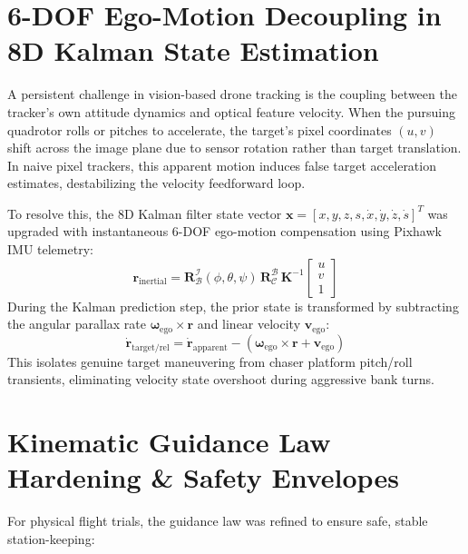 \documentclass[11pt,a4paper]{article}
\begin{document}
\section{6-DOF Ego-Motion Decoupling in 8D Kalman State Estimation}
A persistent challenge in vision-based drone tracking is the coupling between the tracker's own attitude dynamics and optical feature velocity. When the pursuing quadrotor rolls or pitches to accelerate, the target's pixel coordinates $(u, v)$ shift across the image plane due to sensor rotation rather than target translation. In naive pixel trackers, this apparent motion induces false target acceleration estimates, destabilizing the velocity feedforward loop.

To resolve this, the 8D Kalman filter state vector $\mathbf{x} = [x, y, z, s, \dot{x}, \dot{y}, \dot{z}, \dot{s}]^T$ was upgraded with instantaneous 6-DOF ego-motion compensation using Pixhawk IMU telemetry:
\begin{equation}
    \mathbf{r}_{\text{inertial}} = \mathbf{R}_{\mathcal{B}}^{\mathcal{I}}(\phi, \theta, \psi) \, \mathbf{R}_{\mathcal{C}}^{\mathcal{B}} \, \mathbf{K}^{-1} \begin{bmatrix} u \\ v \\ 1 \end{bmatrix}
\end{equation}
During the Kalman prediction step, the prior state is transformed by subtracting the angular parallax rate $\boldsymbol{\omega}_{\text{ego}} \times \mathbf{r}$ and linear velocity $\mathbf{v}_{\text{ego}}$:
\begin{equation}
    \dot{\mathbf{r}}_{\text{target/rel}} = \dot{\mathbf{r}}_{\text{apparent}} - (\boldsymbol{\omega}_{\text{ego}} \times \mathbf{r} + \mathbf{v}_{\text{ego}})
\end{equation}
This isolates genuine target maneuvering from chaser platform pitch/roll transients, eliminating velocity state overshoot during aggressive bank turns.

\section{Kinematic Guidance Law Hardening \& Safety Envelopes}
For physical flight trials, the guidance law was refined to ensure safe, stable station-keeping:
\end{document}
